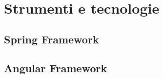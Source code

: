 \chapter{Strumenti e tecnologie}
\label{chap:strumenti}


\section{Spring Framework}


\section{Angular Framework}

